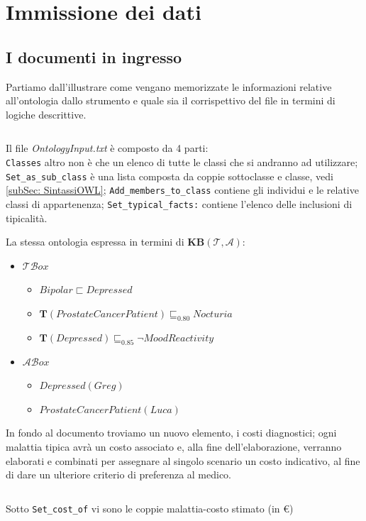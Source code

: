 \section{Immissione dei dati}
\subsection{I documenti in ingresso}
Partiamo dall'illustrare come vengano memorizzate le informazioni relative all'ontologia dallo strumento 
e quale sia il corrispettivo del file in termini di logiche descrittive. 
\inputminted[lastline=11]{text}{codice/ExOntoInput.txt}
Il file \emph{OntologyInput.txt} è composto da 4 parti:\\
\texttt{Classes} altro non è che un elenco di tutte le classi che si andranno ad utilizzare;
\texttt{Set_as_sub_class} è una lista composta da coppie sottoclasse e classe, vedi \ref{subSec: SintassiOWL};
\texttt{Add_members_to_class} contiene gli individui e le relative classi di appartenenza; 
\texttt{Set_typical_facts:} contiene l'elenco delle inclusioni di tipicalità.

La stessa ontologia espressa in termini di \textbf{KB}$ (\mathcal{T}, \mathcal{A}) $:
\begin{itemize}
	\item $\mathcal{TB}ox$ 
		\begin{itemize}
			\item $ Bipolar \sqsubset Depressed $
			\item $ \mathbf T(ProstateCancerPatient) \sqsubseteq_{0.80} Nocturia $
			\item $ \mathbf T(Depressed) \sqsubseteq_{0.85} \neg MoodReactivity $
		\end{itemize}
	\item $\mathcal{AB}ox$ 
		\begin{itemize}
			\item $ Depressed(Greg) $
			\item $ ProstateCancerPatient(Luca) $
		\end{itemize}
\end{itemize}

In fondo al documento troviamo un nuovo elemento, i costi diagnostici; ogni malattia tipica avrà
un costo associato e, alla fine dell'elaborazione, verranno elaborati e combinati per assegnare al singolo
scenario un costo indicativo, al fine di dare un ulteriore criterio di preferenza al medico.
\inputminted[firstline=13]{text}{codice/ExOntoInput.txt}
Sotto \texttt{Set_cost_of} vi sono le coppie malattia-costo stimato (in €)


